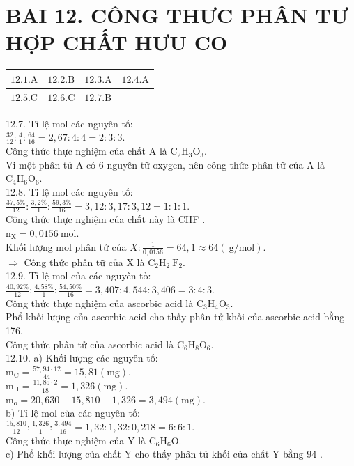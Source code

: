 \documentclass[10pt]{article}
\begin{document}
\section*{BAI 12. CÔNG THƯC PHÂN TƯ HỢP CHẤT HƯU CO}
\begin{center}
\begin{tabular}{|l|l|l|l|}
\hline
$12.1 . \mathrm{A}$ & $12.2 . \mathrm{B}$ & $12.3 . \mathrm{A}$ & $12.4 . \mathrm{A}$ \\
\hline
$12.5 . \mathrm{C}$ & $12.6 . \mathrm{C}$ & $12.7 . \mathrm{B}$ &  \\
\hline
\end{tabular}
\end{center}

12.7. Tỉ lệ mol các nguyên tố:\\
$\frac{32}{12}: \frac{4}{1}: \frac{64}{16}=2,67: 4: 4=2: 3: 3$.\\
Công thức thực nghiệm của chất A là $\mathrm{C}_{2} \mathrm{H}_{3} \mathrm{O}_{3}$.\\
Vi một phân tử A có 6 nguyên tữ oxygen, nên công thức phân tữ của A là $\mathrm{C}_{4} \mathrm{H}_{6} \mathrm{O}_{6}$.\\
12.8. Ti lệ mol các nguyên tố:\\
$\frac{37,5 \%}{12}: \frac{3,2 \%}{1}: \frac{59,3 \%}{16}=3,12: 3,17: 3,12=1: 1: 1$.\\
Công thức thực nghiệm của chất này là CHF .\\
$\mathrm{n}_{\mathrm{X}}=0,0156 \mathrm{~mol}$.\\
Khối lượng mol phân tử của $X: \frac{1}{0,0156}=64,1 \approx 64(\mathrm{~g} / \mathrm{mol})$.\\
$\Rightarrow$ Công thức phân tữ của X là $\mathrm{C}_{2} \mathrm{H}_{2} \mathrm{~F}_{2}$.\\
12.9. Tỉ lệ mol của các nguyên tố:\\
$\frac{40,92 \%}{12}: \frac{4,58 \%}{1}: \frac{54,50 \%}{16}=3,407: 4,544: 3,406=3: 4: 3$.\\
Công thức thực nghiệm của ascorbic acid là $\mathrm{C}_{3} \mathrm{H}_{4} \mathrm{O}_{3}$.\\
Phổ khối lượng của ascorbic acid cho thấy phân tử khối của ascorbic acid bằng 176.\\
Công thức phân tử của ascorbic acid là $\mathrm{C}_{6} \mathrm{H}_{8} \mathrm{O}_{6}$.\\
12.10. a) Khối lượng các nguyên tố:\\
$\mathrm{m}_{\mathrm{C}}=\frac{57,94 \cdot 12}{44}=15,81(\mathrm{mg})$.\\
$\mathrm{m}_{\mathrm{H}}=\frac{11,85 \cdot 2}{18}=1,326(\mathrm{mg})$.\\
$\mathrm{m}_{\mathrm{o}}=20,630-15,810-1,326=3,494(\mathrm{mg})$.\\
b) Tỉ lệ mol của các nguyên tố:\\
$\frac{15,810}{12}: \frac{1,326}{1}: \frac{3,494}{16}=1,32: 1,32: 0,218=6: 6: 1$.\\
Công thức thực nghiệm của Y là $\mathrm{C}_{6} \mathrm{H}_{6} \mathrm{O}$.\\
c) Phổ khối lượng của chất Y cho thấy phân tử khối của chất Y bằng 94 .
\end{document}
